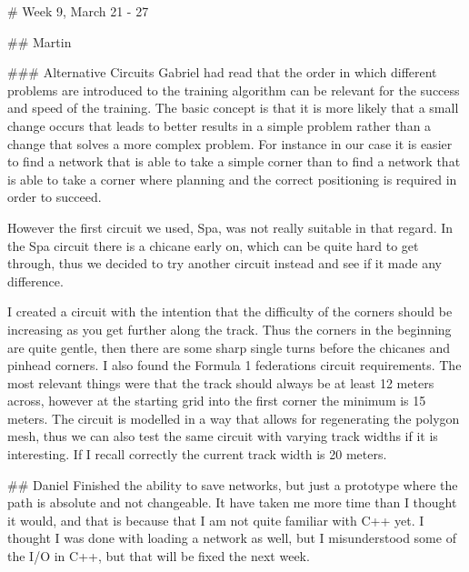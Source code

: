 # Week 9, March 21 - 27


## Martin

### Alternative Circuits
Gabriel had read that the order in which different problems are introduced to the training algorithm can be relevant for the success and speed of the training. The basic concept is that it is more likely that a small change occurs that leads to better results in a simple problem rather than a change that solves a more complex problem. For instance in our case it is easier to find a network that is able to take a simple corner than to find a network that is able to take a corner where planning and the correct positioning is required in order to succeed. 

However the first circuit we used, Spa, was not really suitable in that regard. In the Spa circuit there is a chicane early on, which can be quite hard to get through, thus we decided to try another circuit instead and see if it made any difference. 

I created a circuit with the intention that the difficulty of the corners should be increasing as you get further along the track. Thus the corners in the beginning are quite gentle, then there are some sharp single turns before the chicanes and pinhead corners. I also found the Formula 1 federations circuit requirements. The most relevant things were that the track should always be at least 12 meters across, however at the starting grid into the first corner the minimum is 15 meters. The circuit is modelled in a way that allows for regenerating the polygon mesh, thus we can also test the same circuit with varying track widths if it is interesting. If I recall correctly the current track width is 20 meters. 

## Daniel 
Finished the ability to save networks, but just a prototype where the path is absolute and not changeable. It have taken me more time than I thought it would, and that is because that I am not quite familiar with C++ yet. I thought I was done with loading a network as well, but I misunderstood some of the I/O in C++, but that will be fixed the next week. 